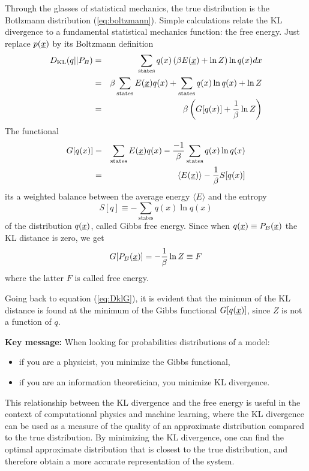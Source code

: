 Through the glasses of statistical mechanics, the true distribution is the Botlzmann distribution (\ref{eq:boltzmann}). Simple calculations relate the KL divergence to a fundamental statistical mechanics function: the free energy. Just replace $p(\underline{x})$ by its Boltzmann definition
\begin{eqnarray}
    D_{\text{KL}}(q||P_{B}) &=& \sum_{\text{states}} q(x)\left( \beta E(\underline{x}) +  \ln Z \right) \ln q(x) dx \\
    &=& \beta   \sum_{\text{states}} E(\underline{x}) q(x) +  \sum_{\text{states}} q(x) \ln q(x)  + \ln Z \\
    &=& \beta \left( G[q(x)] + \frac 1 \beta \ln Z\right) \label{eq:DklG}
\end{eqnarray}
The functional
\begin{eqnarray*}
G[q(x)]  &=& \sum_{\text{states}} E(\underline{x}) q(x) -  \frac {-1} \beta\sum_{\text{states}} q(x) \ln q(x)  \\
&=&  \langle E(\underline{x}) \rangle -  \frac {1} \beta S[ q(x)]
\end{eqnarray*}
its a weighted balance between the average energy $\langle E \rangle$ and the entropy
\[S[q] \equiv - \sum_{\text{states}} q(x) \ln q(x) \]
of the distribution $q(\underline{x})$, called Gibbs free energy. Since when $q(\underline{x})\equiv P_B(\underline{x})$ the KL distance is zero, we get
\begin{equation}
G[P_B(\underline{x})] = - \frac 1 \beta \ln Z \equiv F
\end{equation}
where the latter $F$ is called free energy.

Going back to equation (\ref{eq:DklG}), it is evident that the minimun of the KL distance is found at the minimum of the Gibbs functional  $G[q(\underline{x})]$, since $Z$ is not a function of $q$.

{\bf Key message:  } When looking for probabilities distributions of a model:
\begin{itemize}                                     \item if you are a physicist, you minimize the Gibbs functional,
 \item if you are an information theoretician, you minimize KL divergence.
\end{itemize}

This relationship between the KL divergence and the free energy is useful in the context of computational physics and machine learning, where the KL divergence can be used as a measure of the quality of an approximate distribution compared to the true distribution. By minimizing the KL divergence, one can find the optimal approximate distribution that is closest to the true distribution, and therefore obtain a more accurate representation of the system.

